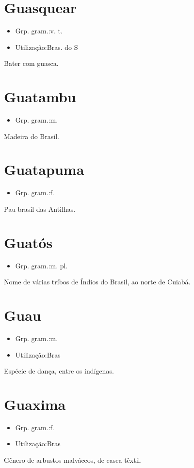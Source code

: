 \section{Guasquear}
\begin{itemize}
\item {Grp. gram.:v. t.}
\end{itemize}
\begin{itemize}
\item {Utilização:Bras. do S}
\end{itemize}
Bater com guasca.
\section{Guatambu}
\begin{itemize}
\item {Grp. gram.:m.}
\end{itemize}
Madeira do Brasil.
\section{Guatapuma}
\begin{itemize}
\item {Grp. gram.:f.}
\end{itemize}
Pau brasil das Antilhas.
\section{Guatós}
\begin{itemize}
\item {Grp. gram.:m. pl.}
\end{itemize}
Nome de várias tríbos de Índios do Brasil, ao norte de Cuiabá.
\section{Guau}
\begin{itemize}
\item {Grp. gram.:m.}
\end{itemize}
\begin{itemize}
\item {Utilização:Bras}
\end{itemize}
Espécie de dança, entre os indígenas.
\section{Guaxima}
\begin{itemize}
\item {Grp. gram.:f.}
\end{itemize}
\begin{itemize}
\item {Utilização:Bras}
\end{itemize}
Gênero de arbustos malváceos, de casca têxtil.

